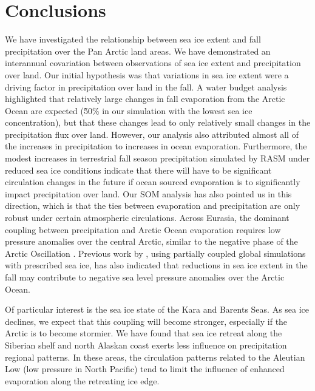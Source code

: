 \section{Conclusions}
\label{sec:conclusions_ch5}
We have investigated the relationship between sea ice extent and fall precipitation over the Pan Arctic land areas.
We have demonstrated an interannual covariation between observations of sea ice extent and precipitation over land.
Our initial hypothesis was that variations in sea ice extent were a driving factor in precipitation over land in the fall.
A water budget analysis highlighted that relatively large changes in fall evaporation from the Arctic Ocean are expected (\~50\% in our simulation with the lowest sea ice concentration), but that these changes lead to only relatively small changes in the precipitation flux over land.
However, our analysis also attributed almost all of the increases in precipitation to increases in ocean evaporation.
Furthermore, the modest increases in terrestrial fall season precipitation simulated by RASM under reduced sea ice conditions indicate that there will have to be significant circulation changes in the future if ocean sourced evaporation is to significantly impact precipitation over land.
Our SOM analysis has also pointed us in this direction, which is that the ties between evaporation and precipitation are only robust under certain atmospheric circulations.
Across Eurasia, the dominant coupling between precipitation and Arctic Ocean evaporation requires low pressure anomalies over the central Arctic, similar to the negative phase of the Arctic Oscillation \citep{Thompson_1998}.
Previous work by \citet{Cassano_2014}, using partially coupled global simulations with prescribed sea ice, has also indicated that reductions in sea ice extent in the fall may contribute to negative sea level pressure anomalies over the Arctic Ocean.

Of particular interest is the sea ice state of the Kara and Barents Seas.
As sea ice declines, we expect that this coupling will become stronger, especially if the Arctic is to become stormier.
We have found that sea ice retreat along the Siberian shelf and north Alaskan coast exerts less influence on precipitation regional patterns.
In these areas, the circulation patterns related to the Aleutian Low (low pressure in North Pacific) tend to limit the influence of enhanced evaporation along the retreating ice edge.
